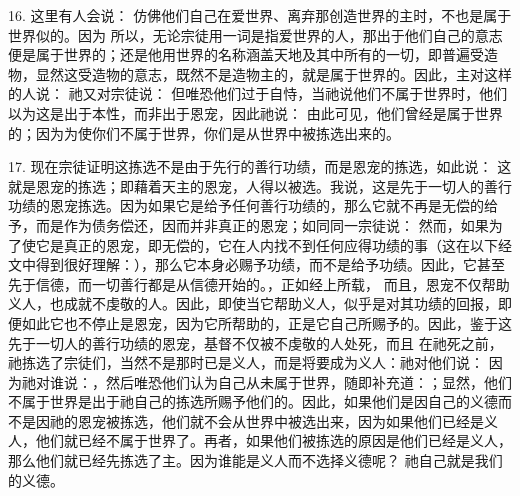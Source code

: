 16. 这里有人会说： 仿佛他们自己在爱世界、离弃那创造世界的主时，不也是属于世界似的。因为  所以，无论宗徒用一词是指爱世界的人，那出于他们自己的意志便是属于世界的；还是他用世界的名称涵盖天地及其中所有的一切，即普遍受造物，显然这受造物的意志，既然不是造物主的，就是属于世界的。因此，主对这样的人说： 祂又对宗徒说： 但唯恐他们过于自恃，当祂说他们不属于世界时，他们以为这是出于本性，而非出于恩宠，因此祂说： 由此可见，他们曾经是属于世界的；因为为使你们不属于世界，你们是从世界中被拣选出来的。\par

17. 现在宗徒证明这拣选不是由于先行的善行功绩，而是恩宠的拣选，如此说： 这就是恩宠的拣选；即藉着天主的恩宠，人得以被选。我说，这是先于一切人的善行功绩的恩宠拣选。因为如果它是给予任何善行功绩的，那么它就不再是无偿的给予，而是作为债务偿还，因而并非真正的恩宠；如同同一宗徒说： 然而，如果为了使它是真正的恩宠，即无偿的，它在人内找不到任何应得功绩的事（这在以下经文中得到很好理解：），那么它本身必赐予功绩，而不是给予功绩。因此，它甚至先于信德，而一切善行都是从信德开始的。，正如经上所载， 而且，恩宠不仅帮助义人，也成就不虔敬的人。因此，即使当它帮助义人，似乎是对其功绩的回报，即便如此它也不停止是恩宠，因为它所帮助的，正是它自己所赐予的。因此，鉴于这先于一切人的善行功绩的恩宠，基督不仅被不虔敬的人处死，而且 在祂死之前，祂拣选了宗徒们，当然不是那时已是义人，而是将要成为义人：祂对他们说： 因为祂对谁说：，然后唯恐他们认为自己从未属于世界，随即补充道：；显然，他们不属于世界是出于祂自己的拣选所赐予他们的。因此，如果他们是因自己的义德而不是因祂的恩宠被拣选，他们就不会从世界中被选出来，因为如果他们已经是义人，他们就已经不属于世界了。再者，如果他们被拣选的原因是他们已经是义人，那么他们就已经先拣选了主。因为谁能是义人而不选择义德呢？ 祂自己就是我们的义德。\par

